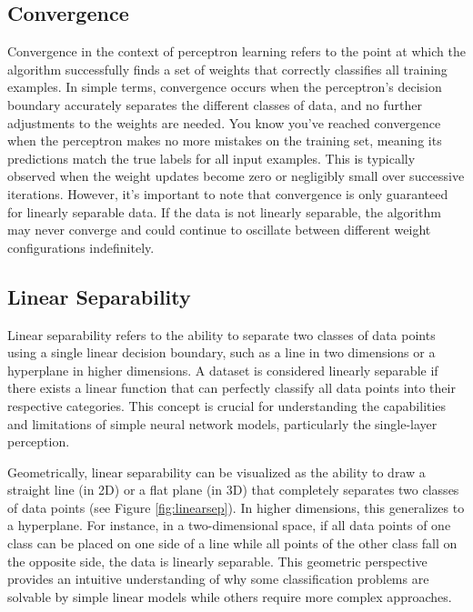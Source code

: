 \subsection{Convergence}
Convergence in the context of perceptron learning refers to the point at which the algorithm successfully finds a set of weights that correctly classifies all training examples. In simple terms, convergence occurs when the perceptron's decision boundary accurately separates the different classes of data, and no further adjustments to the weights are needed. You know you've reached convergence when the perceptron makes no more mistakes on the training set, meaning its predictions match the true labels for all input examples. This is typically observed when the weight updates become zero or negligibly small over successive iterations. However, it's important to note that convergence is only guaranteed for linearly separable data. If the data is not linearly separable, the algorithm may never converge and could continue to oscillate between different weight configurations indefinitely.

\subsection{Linear Separability}
Linear separability refers to the ability to separate two classes of data points using a single linear decision boundary, such as a line in two dimensions or a hyperplane in higher dimensions. A dataset is considered linearly separable if there exists a linear function that can perfectly classify all data points into their respective categories. This concept is crucial for understanding the capabilities and limitations of simple neural network models, particularly the single-layer perception.

Geometrically, linear separability can be visualized as the ability to draw a straight line (in 2D) or a flat plane (in 3D) that completely separates two classes of data points (see Figure \ref{fig:linearsep}). In higher dimensions, this generalizes to a hyperplane. For instance, in a two-dimensional space, if all data points of one class can be placed on one side of a line while all points of the other class fall on the opposite side, the data is linearly separable. This geometric perspective provides an intuitive understanding of why some classification problems are solvable by simple linear models while others require more complex approaches.

